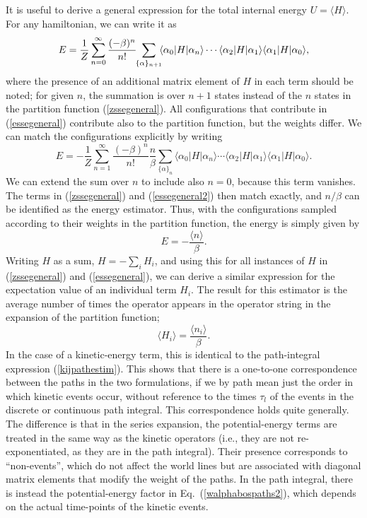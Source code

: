 \documentclass[draft,numberedheadings]{aipproc}
\begin{document}
It is useful to derive a general expression for the total internal energy $U=\langle H\rangle$. For any hamiltonian, we can write it as
\begin{equation}
E = \frac{1}{Z} \sum_{n=0}^\infty \frac{(-\beta)^n}{n!} \hskip-1mm \sum_{\{\alpha\}_{n+1}} \hskip-1mm
\langle \alpha_0|H|\alpha_{n}\rangle \cdots \langle \alpha_2 |H|\alpha_1\rangle\langle \alpha_1 |H|\alpha_0\rangle, 
\label{essegeneral}
\end{equation}
where the presence of an additional matrix element of $H$ in each term should be noted; for given $n$, the summation is over $n+1$ states instead of the $n$ states in 
the partition function (\ref{zssegeneral}). All configurations that contribute in (\ref{essegeneral}) contribute also to the partition function, 
but the weights differ. We can match the configurations explicitly by writing
\begin{equation}
E = -\frac{1}{Z} \sum_{n=1}^\infty \frac{(-\beta)^{n}}{n!}\frac{n}{\beta}
\sum_{\{\alpha\}_{n}} \langle \alpha_0|H|\alpha_{n}\rangle \cdots \langle \alpha_2 |H|\alpha_1\rangle\langle \alpha_1 |H|\alpha_0\rangle.
\label{essegeneral2}
\end{equation}
We can extend the sum over $n$ to include also $n=0$, because this term vanishes. The terms in (\ref{zssegeneral}) and (\ref{essegeneral2}) then match
exactly, and $n/\beta$ can be identified as the energy estimator. Thus, with the configurations sampled according to their weights in the partition 
function, the energy is simply given by
\begin{equation}
E = -\frac{\langle n\rangle}{\beta}.
\label{essenbeta}
\end{equation}
Writing $H$ as a sum, $H=-\sum_i H_i$, and using this for all instances of $H$ in (\ref{zssegeneral}) and (\ref{essegeneral}), we can derive a similar 
expression for the expectation value of an individual term $H_i$. The result for this estimator is the average number of times the operator appears in 
the operator string in the expansion of the partition function;
\begin{equation}
\langle H_i\rangle = \frac{\langle n_i\rangle}{\beta}.
\label{hiexpsse}
\end{equation}
In the case of a kinetic-energy term, this is identical to the path-integral expression (\ref{kijpathestim}). This shows that there is a one-to-one
correspondence between the paths in the two formulations, if we by path mean just the order in which kinetic events occur, without reference to the
times $\tau_l$ of the events in the discrete or continuous path integral. This correspondence holds quite generally. The difference is that in the
series expansion, the potential-energy terms are treated in the same way as the kinetic operators (i.e., they are not re-exponentiated, as they are in the 
path integral). Their presence corresponds to ``non-events'', which do not affect the world lines but are associated with diagonal matrix elements that 
modify the weight of the paths. In the path integral, there is instead the potential-energy factor in Eq.~(\ref{walphabospaths2}), which depends on the 
actual time-points of the kinetic events. 
\end{document}
